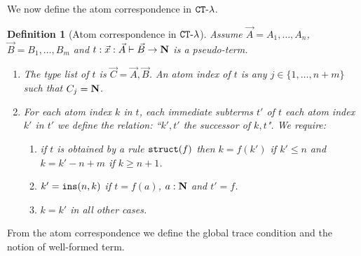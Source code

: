 \documentclass{article}
\newtheorem{definition}[theorem]{Definition}
\begin{document}
We now define the atom correspondence in ${ {\tt CT} \mbox{-} \lambda}$.



\begin{definition}[Atom correspondence in  ${ {\tt CT} \mbox{-} \lambda}$]
Assume $\vec{A} = A_1, \ldots, A_n$, $\vec{B}=B_1, \ldots, B_m$
and $t:\vec{x}:\vec{A} \vdash \vec{B} \rightarrow {\bf N}$ is a pseudo-term.

\begin{enumerate}
\item
The type list of $t$ is $\vec{C} = \vec{A},\vec{B}$. 
An atom index of $t$ is any $j \in \{1, \ldots, n+m\}$ such that $C_j = {\bf N}$.

\item
For each atom index $k$ in $t$, each immediate subterms $t'$ of $t$ 
each atom index $k'$ in $t'$ we define the relation: ``$k',t'$ the successor of $k,t$". We require:
\begin{enumerate}
\item
if $t$ is obtained by a rule ${\tt struct}(f)$ then $k = f(k')$  if $k' \le n$ and $k = k' - n + m$ if $k \ge n+1$.
\item
$k' = {\tt ins}(n,k)$ if $t=f(a)$, $a:{\bf N}$ and $t'=f$. 
\item
$k = k'$ in all other cases.
\end{enumerate}
\end{enumerate}
\end{definition}

From the atom correspondence we define the global trace condition and the notion of well-formed term.
\end{document}
